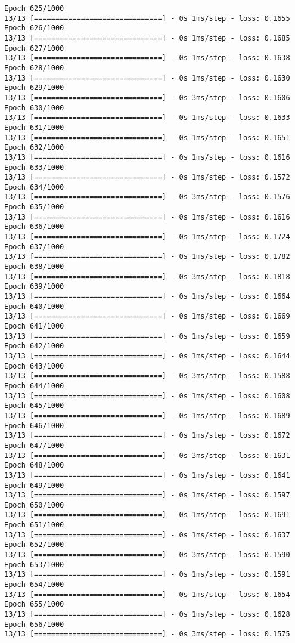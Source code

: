 \documentclass[11pt]{article}
\begin{document}
\begin{Verbatim}[commandchars=\\\{\}]
Epoch 625/1000
13/13 [==============================] - 0s 1ms/step - loss: 0.1655
Epoch 626/1000
13/13 [==============================] - 0s 1ms/step - loss: 0.1685
Epoch 627/1000
13/13 [==============================] - 0s 1ms/step - loss: 0.1638
Epoch 628/1000
13/13 [==============================] - 0s 1ms/step - loss: 0.1630
Epoch 629/1000
13/13 [==============================] - 0s 3ms/step - loss: 0.1606
Epoch 630/1000
13/13 [==============================] - 0s 1ms/step - loss: 0.1633
Epoch 631/1000
13/13 [==============================] - 0s 1ms/step - loss: 0.1651
Epoch 632/1000
13/13 [==============================] - 0s 1ms/step - loss: 0.1616
Epoch 633/1000
13/13 [==============================] - 0s 1ms/step - loss: 0.1572
Epoch 634/1000
13/13 [==============================] - 0s 3ms/step - loss: 0.1576
Epoch 635/1000
13/13 [==============================] - 0s 1ms/step - loss: 0.1616
Epoch 636/1000
13/13 [==============================] - 0s 1ms/step - loss: 0.1724
Epoch 637/1000
13/13 [==============================] - 0s 1ms/step - loss: 0.1782
Epoch 638/1000
13/13 [==============================] - 0s 3ms/step - loss: 0.1818
Epoch 639/1000
13/13 [==============================] - 0s 1ms/step - loss: 0.1664
Epoch 640/1000
13/13 [==============================] - 0s 1ms/step - loss: 0.1669
Epoch 641/1000
13/13 [==============================] - 0s 1ms/step - loss: 0.1659
Epoch 642/1000
13/13 [==============================] - 0s 1ms/step - loss: 0.1644
Epoch 643/1000
13/13 [==============================] - 0s 3ms/step - loss: 0.1588
Epoch 644/1000
13/13 [==============================] - 0s 1ms/step - loss: 0.1608
Epoch 645/1000
13/13 [==============================] - 0s 1ms/step - loss: 0.1689
Epoch 646/1000
13/13 [==============================] - 0s 1ms/step - loss: 0.1672
Epoch 647/1000
13/13 [==============================] - 0s 3ms/step - loss: 0.1631
Epoch 648/1000
13/13 [==============================] - 0s 1ms/step - loss: 0.1641
Epoch 649/1000
13/13 [==============================] - 0s 1ms/step - loss: 0.1597
Epoch 650/1000
13/13 [==============================] - 0s 1ms/step - loss: 0.1691
Epoch 651/1000
13/13 [==============================] - 0s 1ms/step - loss: 0.1637
Epoch 652/1000
13/13 [==============================] - 0s 3ms/step - loss: 0.1590
Epoch 653/1000
13/13 [==============================] - 0s 1ms/step - loss: 0.1591
Epoch 654/1000
13/13 [==============================] - 0s 1ms/step - loss: 0.1654
Epoch 655/1000
13/13 [==============================] - 0s 1ms/step - loss: 0.1628
Epoch 656/1000
13/13 [==============================] - 0s 3ms/step - loss: 0.1575

\end{Verbatim}
\end{document}
